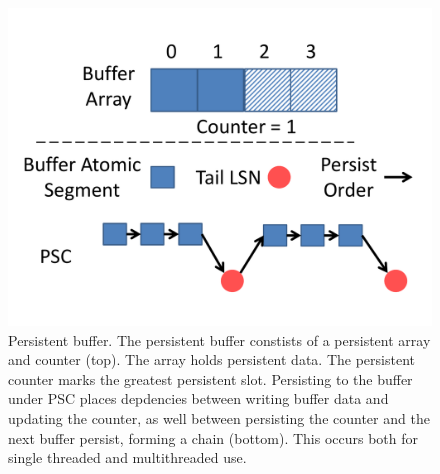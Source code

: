 \begin{figure}
\centering
\includegraphics[width=\textwidth]{PMC_patterns/buffer.pdf}
\caption{Persistent buffer. The persistent buffer constists of a persistent array and counter (top).  The array holds persistent data.  The persistent counter marks the greatest persistent slot.  Persisting to the buffer under PSC places depdencies between writing buffer data and updating the counter, as well between persisting the counter and the next buffer persist, forming a chain (bottom).  This occurs both for single threaded and multithreaded use.}
\label{figure::buffer}
\end{figure}
